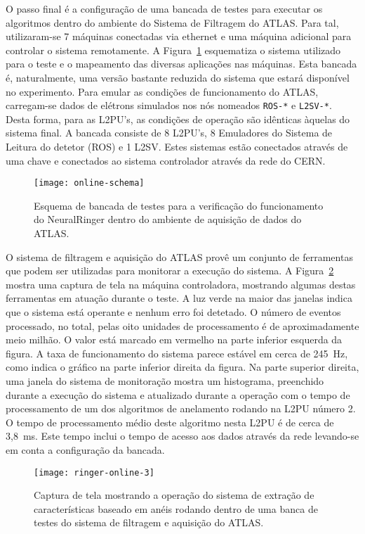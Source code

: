 O passo final é a configuração de uma bancada de testes para executar os
algoritmos dentro do ambiente do Sistema de Filtragem do ATLAS. Para tal,
utilizaram-se 7 máquinas conectadas via  ethernet e uma máquina
adicional para controlar o sistema remotamente.  A
Figura~\ref{fig:online-schema} esquematiza o sistema utilizado para o teste e
o mapeamento das diversas aplicações nas máquinas. Esta bancada é,
naturalmente, uma versão bastante reduzida do sistema que estará disponível no
experimento. Para emular as condições de funcionamento do ATLAS, carregam-se
dados de elétrons simulados nos nós nomeados \texttt{ROS-*} e
\texttt{L2SV-*}. Desta forma, para as L2PU's, as condições de operação são
idênticas àquelas do sistema final. A bancada consiste de 8 L2PU's, 8
Emuladores do Sistema de Leitura do detetor (ROS) e 1 L2SV. Estes sistemas
estão conectados através de uma chave  e conectados ao
sistema controlador através da rede do CERN.

\begin{figure}
\begin{center}
\texttt{[image: online-schema]}
\end{center}
\caption{Esquema de bancada de testes para a verificação do funcionamento do
NeuralRinger dentro do ambiente de aquisição de dados do ATLAS.}
\label{fig:online-schema}
\end{figure}

O sistema de filtragem e aquisição do ATLAS provê um conjunto de ferramentas
que podem ser utilizadas para monitorar a execução do sistema. A
Figura~\ref{fig:ringer-screenshot} mostra uma captura de tela na máquina
controladora, mostrando algumas destas ferramentas em atuação durante o
teste. A luz verde na maior das janelas indica que o sistema está operante e
nenhum erro foi detetado. O número de eventos processado, no total, pelas oito
unidades de processamento é de aproximadamente meio milhão. O valor está
marcado em vermelho na parte inferior esquerda da figura. A taxa de
funcionamento do sistema parece estável em cerca de 245~Hz, como indica o
gráfico na parte inferior direita da figura. Na parte superior direita, uma
janela do sistema de monitoração  mostra um histograma, preenchido
durante a execução do sistema e atualizado durante a operação com o tempo de
processamento de um dos algoritmos de anelamento rodando na L2PU número 2. O
tempo de processamento médio deste algoritmo nesta L2PU é de cerca de
3,8~ms. Este tempo inclui o tempo de acesso aos dados através da rede
 levando-se em conta a configuração da bancada.

\begin{figure}
\begin{center}
\texttt{[image: ringer-online-3]}
\end{center}
\caption{Captura de tela mostrando a operação do sistema de extração de
características baseado em anéis rodando dentro de uma banca de testes do
sistema de filtragem e aquisição do ATLAS.}
\label{fig:ringer-screenshot}
\end{figure}

